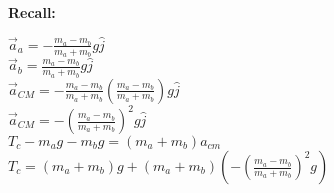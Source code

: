 \documentclass{article}
\begin{document}
\begin{enumerate}
\begin{itemize}
            \textbf{Recall:} 
            \begin{center}$\vec{a}_a=-\frac{m_a-m_b}{m_a+m_b}g\hat{j}$\\
            $\vec{a}_b=\frac{m_a-m_b}{m_a+m_b}g\hat{j}$\\
            $\vec{a}_{CM}=-\frac{m_a-m_b}{m_a+m_b}(\frac{m_a-m_b}{m_a+m_b})g\hat{j}$\\
            $\vec{a}_{CM}=-(\frac{m_a-m_b}{m_a+m_b})^2g\hat{j}$\\
            $T_c-m_ag-m_bg=(m_a+m_b)a_{cm}$\\
            $T_c=(m_a+m_b)g+(m_a+m_b)(-(\frac{m_a-m_b}{m_a+m_b})^2g)$\\
            \end{center}
        \end{itemize}
\end{enumerate}
\end{document}

